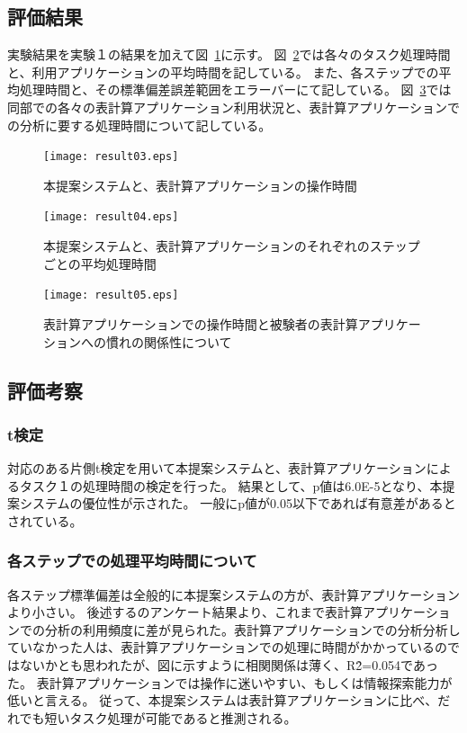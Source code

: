 \documentclass[sotsuron]{kuee}
\begin{document}
		\subsection{評価結果}
			実験結果を実験１の結果を加えて図~\ref{fig:result03}に示す。
			図~\ref{fig:result04}では各々のタスク処理時間と、利用アプリケーションの平均時間を記している。
			また、各ステップでの平均処理時間と、その標準偏差誤差範囲をエラーバーにて記している。
			図~\ref{fig:result05}では同部での各々の表計算アプリケーション利用状況と、表計算アプリケーションでの分析に要する処理時間について記している。
			\begin{figure}
				\begin{center}
					\texttt{[image: result03.eps]}
				\end{center}
				\caption{本提案システムと、表計算アプリケーションの操作時間}
		  		\label{fig:result03}
			\end{figure}
			\begin{figure}
				\begin{center}
					\texttt{[image: result04.eps]}
				\end{center}
				\caption{本提案システムと、表計算アプリケーションのそれぞれのステップごとの平均処理時間}
		  		\label{fig:result04}
			\end{figure}
			\begin{figure}
				\begin{center}
					\texttt{[image: result05.eps]}
				\end{center}
				\caption{表計算アプリケーションでの操作時間と被験者の表計算アプリケーションへの慣れの関係性について}
		  		\label{fig:result05}
			\end{figure}
		\subsection{評価考察}
			\subsubsection{t検定}
				対応のある片側t検定を用いて本提案システムと、表計算アプリケーションによるタスク１の処理時間の検定を行った。
				結果として、p値は6.0E-5となり、本提案システムの優位性が示された。
				一般にp値が0.05以下であれば有意差があるとされている。
			\subsubsection{各ステップでの処理平均時間について}
				各ステップ標準偏差は全般的に本提案システムの方が、表計算アプリケーションより小さい。
				後述するのアンケート結果より、これまで表計算アプリケーションでの分析の利用頻度に差が見られた。表計算アプリケーションでの分析分析していなかった人は、表計算アプリケーションでの処理に時間がかかっているのではないかとも思われたが、図に示すように相関関係は薄く、R\^2=0.054であった。
				表計算アプリケーションでは操作に迷いやすい、もしくは情報探索能力が低いと言える。
				従って、本提案システムは表計算アプリケーションに比べ、だれでも短いタスク処理が可能であると推測される。
\end{document}
